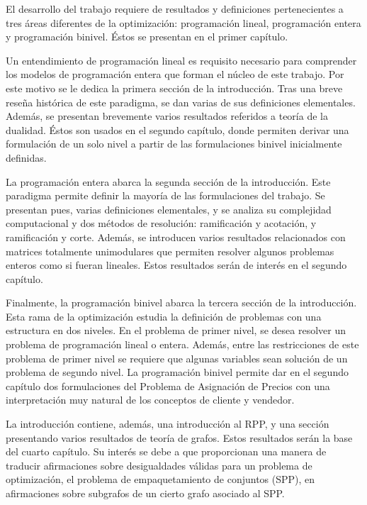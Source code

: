 El desarrollo del trabajo requiere de resultados y definiciones pertenecientes a
tres áreas diferentes de la optimización: programación lineal, programación
entera y programación binivel. Éstos se presentan en el primer capítulo.

Un entendimiento de programación lineal es requisito necesario para comprender
los modelos de programación entera que forman el núcleo de este trabajo. Por
este motivo se le dedica la primera sección de la introducción. Tras una breve
reseña histórica de este paradigma, se dan varias de sus definiciones
elementales. Además, se presentan brevemente varios resultados referidos a
teoría de la dualidad. Éstos son usados en el segundo capítulo, donde permiten
derivar una formulación de un solo nivel a partir de las formulaciones binivel
inicialmente definidas.

La programación entera abarca la segunda sección de la introducción. Este
paradigma permite definir la mayoría de las formulaciones del trabajo. Se
presentan pues, varias definiciones elementales, y se analiza su complejidad
computacional y dos métodos de resolución: ramificación y acotación, y
ramificación y corte. Además, se introducen varios resultados relacionados con
matrices totalmente unimodulares que permiten resolver algunos problemas enteros
como si fueran lineales. Estos resultados serán de interés en el segundo
capítulo.

Finalmente, la programación binivel abarca la tercera sección de la
introducción. Esta rama de la optimización estudia la definición de problemas
con una estructura en dos niveles. En el problema de primer nivel, se desea
resolver un problema de programación lineal o entera. Además, entre las
restricciones de este problema de primer nivel se requiere que algunas variables
sean solución de un problema de segundo nivel. La programación binivel permite
dar en el segundo capítulo dos formulaciones del Problema de Asignación de
Precios con una interpretación muy natural de los conceptos de cliente y
vendedor.

La introducción contiene, además, una introducción al RPP, y una sección
presentando varios resultados de teoría de grafos. Estos resultados serán la
base del cuarto capítulo. Su interés se debe a que proporcionan una manera de
traducir afirmaciones sobre desigualdades válidas para un problema de
optimización, el problema de empaquetamiento de conjuntos (SPP), en afirmaciones
sobre subgrafos de un cierto grafo asociado al SPP.

\paragraph*{}


